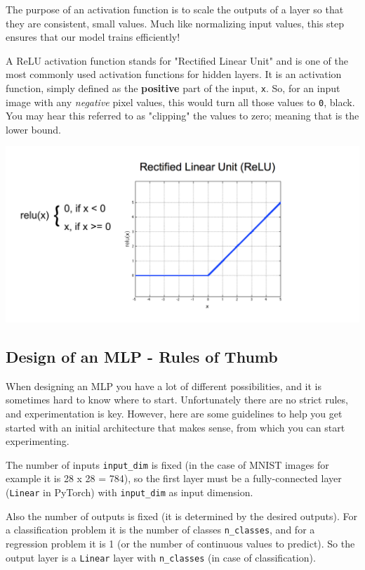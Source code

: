 The purpose of an activation function is to scale the outputs of a layer so that they are consistent, small values. Much like normalizing input values, this step ensures that our model trains efficiently! \newline

A ReLU activation function stands for "Rectified Linear Unit" and is one of the most commonly used activation functions for hidden layers. It is an activation function, simply defined as the \textbf{positive} part of the input, \verb|x|. So, for an input image with any \textit{negative} pixel values, this would turn all those values to \verb|0|, black. You may hear this referred to as "clipping" the values to zero; meaning that is the lower bound.

\includegraphics[width=0.75\linewidth]{img//cnn/relu-ex.png}

\subsection{Design of an MLP - Rules of Thumb}

When designing an MLP you have a lot of different possibilities, and it is sometimes hard to know where to start. Unfortunately there are no strict rules, and experimentation is key. However, here are some guidelines to help you get started with an initial architecture that makes sense, from which you can start experimenting. \newline

The number of inputs \verb|input_dim| is fixed (in the case of MNIST images for example it is 28 x 28 = 784), so the first layer must be a fully-connected layer (\verb|Linear| in PyTorch) with \verb|input_dim| as input dimension. \newline

Also the number of outputs is fixed (it is determined by the desired outputs). For a classification problem it is the number of classes \verb|n_classes|, and for a regression problem it is 1 (or the number of continuous values to predict). So the output layer is a \verb|Linear| layer with \verb|n_classes| (in case of classification). \newline

